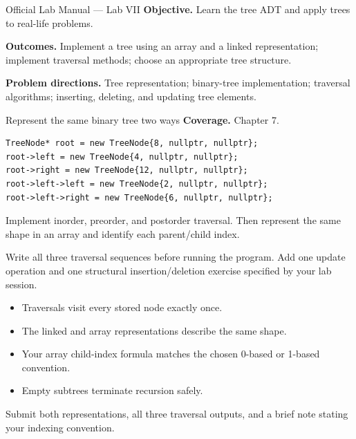 
\begin{sourcealignment}{Official Lab Manual --- Lab VII}
\textbf{Objective.} Learn the tree ADT and apply trees to real-life problems.

\textbf{Outcomes.} Implement a tree using an array and a linked representation; implement traversal methods; choose an appropriate tree structure.

\textbf{Problem directions.} Tree representation; binary-tree implementation; traversal algorithms; inserting, deleting, and updating tree elements.
\end{sourcealignment}

\begin{labproject}{Represent the same binary tree two ways}
\textbf{Coverage.} Chapter 7.

\begin{lstlisting}
TreeNode* root = new TreeNode{8, nullptr, nullptr};
root->left = new TreeNode{4, nullptr, nullptr};
root->right = new TreeNode{12, nullptr, nullptr};
root->left->left = new TreeNode{2, nullptr, nullptr};
root->left->right = new TreeNode{6, nullptr, nullptr};
\end{lstlisting}

Implement inorder, preorder, and postorder traversal. Then represent the same shape in an array and identify each parent/child index.

\begin{tryit}
Write all three traversal sequences before running the program. Add one update operation and one structural insertion/deletion exercise specified by your lab session.
\end{tryit}
\end{labproject}

\begin{verification}
\begin{itemize}
  \item Traversals visit every stored node exactly once.
  \item The linked and array representations describe the same shape.
  \item Your array child-index formula matches the chosen 0-based or 1-based convention.
  \item Empty subtrees terminate recursion safely.
\end{itemize}
\end{verification}

\begin{labdeliverable}
Submit both representations, all three traversal outputs, and a brief note stating your indexing convention.
\end{labdeliverable}
